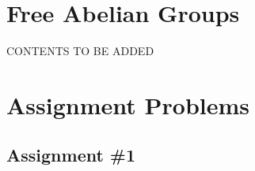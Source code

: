 \documentclass[notoc,notitlepage]{tufte-book}
\begin{document}


\appendix

\chapter{Free Abelian Groups}%
\label{chp:free_abelian_groups}

CONTENTS TO BE ADDED %


\chapter{Assignment Problems}%
\label{chp:assignment_problems}

\section{Assignment \#1}%
\label{sec:assignment_1}
\end{document}
